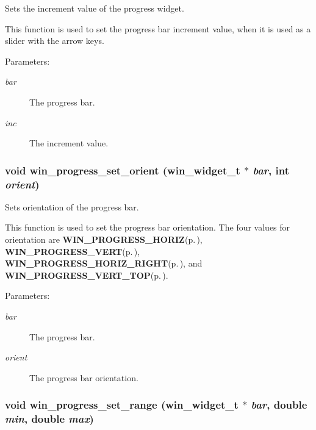 Sets the increment value of the progress widget. 

This function is used to set the progress bar increment value, when it is used as a slider with the arrow keys.

\begin{Desc}
\item[Parameters:]
\begin{description}
\item[{\em bar}]The progress bar. \item[{\em inc}]The increment value. \end{description}
\end{Desc}
\subsubsection{\setlength{\rightskip}{0pt plus 5cm}void win\_\-progress\_\-set\_\-orient ({\bf win\_\-widget\_\-t} $\ast$ {\em bar}, int {\em orient})}\label{winprogress_8h_a8}


Sets orientation of the progress bar. 

This function is used to set the progress bar orientation. The four values for orientation are {\bf WIN\_\-PROGRESS\_\-HORIZ}{\rm (p.\,\pageref{winprogress_8h_a0})}, {\bf WIN\_\-PROGRESS\_\-VERT}{\rm (p.\,\pageref{winprogress_8h_a1})}, {\bf WIN\_\-PROGRESS\_\-HORIZ\_\-RIGHT}{\rm (p.\,\pageref{winprogress_8h_a2})}, and {\bf WIN\_\-PROGRESS\_\-VERT\_\-TOP}{\rm (p.\,\pageref{winprogress_8h_a3})}.

\begin{Desc}
\item[Parameters:]
\begin{description}
\item[{\em bar}]The progress bar. \item[{\em orient}]The progress bar orientation. \end{description}
\end{Desc}
\subsubsection{\setlength{\rightskip}{0pt plus 5cm}void win\_\-progress\_\-set\_\-range ({\bf win\_\-widget\_\-t} $\ast$ {\em bar}, double {\em min}, double {\em max})}\label{winprogress_8h_a9}


